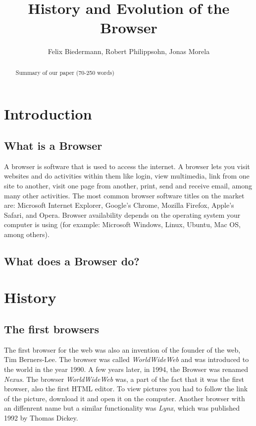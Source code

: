 \documentclass[runningheads]{llncs}
\title{History and Evolution of the Browser}
\author{Felix Biedermann, Robert Philippsohn, Jonas Morela}
\institute{University of Stuttgart, Institute for Architecture of Application Systems \\
Universitätsstraße 38, 70569 Stuttgart, Germany}
\begin{document}
\maketitle

	\begin{abstract}
		Summary of our paper (70-250 words)
	\end{abstract}

\clearpage
	\section{Introduction}
		\subsection{What is a Browser}
		A browser is software that is used to access the internet. A browser lets you visit websites and do activities within them like login, view multimedia, link from one site to another, visit one page from another, print, send and receive email, among many other activities. The most common browser software titles on the market are: Microsoft Internet Explorer, Google's Chrome, Mozilla Firefox, Apple's Safari, and Opera. Browser availability depends on the operating system your computer is using (for example: Microsoft Windows, Linux, Ubuntu, Mac OS, among others).
		\subsection{What does a Browser do?}
	\section{History}
		\subsection{The first browsers}
		The first browser for the web was also an invention of the founder of the web, Tim Berners-Lee. The browser was called \textit{WorldWideWeb} and was introduced to the world in the year 1990. A few years later, in 1994, the Browser was renamed \textit{Nexus}. The browser \textit{WorldWideWeb} was, a part of the fact that it was the first browser, also the first HTML editor.
		To view pictures you had to follow the link of the picture, download it and open it on the computer. Another browser with an diffenrent name but a similar functionality was \textit{Lynx}, which was published 1992 by Thomas Dickey.
\end{document}
